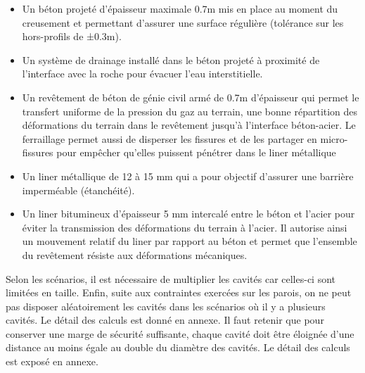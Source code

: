 \documentclass[11pt,french,a4paper]{article}
\begin{document}
\begin{itemize}
\item Un béton projeté d’épaisseur maximale 0.7m mis en place au moment du creusement et permettant d’assurer une surface régulière (tolérance sur les hors-profils de ±0.3m).
\item Un système de drainage installé dans le béton projeté à proximité de l'interface avec la roche pour évacuer l'eau interstitielle.
\item Un revêtement de béton de génie civil armé de 0.7m d'épaisseur qui permet le transfert  uniforme de la pression du gaz au terrain, une bonne répartition des déformations du terrain dans le revêtement jusqu’à l’interface béton-acier. Le ferraillage permet aussi de disperser les fissures et de les partager en micro-fissures pour empêcher qu’elles puissent pénétrer dans le liner métallique 
\item Un liner métallique de 12 à 15 mm qui a pour objectif d'assurer une barrière imperméable (étanchéité).
\item Un liner bitumineux d'épaisseur 5 mm intercalé entre le béton et l’acier pour éviter la transmission des déformations du terrain à l’acier. Il autorise ainsi un mouvement relatif du liner par rapport au béton et permet que l’ensemble du revêtement résiste aux déformations mécaniques.
\end{itemize}

Selon les scénarios, il est nécessaire de multiplier les cavités car celles-ci sont limitées en taille. Enfin, suite aux contraintes exercées sur les parois, on ne peut pas disposer aléatoirement les cavités dans les scénarios où il y a plusieurs cavités. Le détail des calculs est donné en annexe. Il faut retenir que pour conserver une marge de sécurité suffisante, chaque cavité doit être éloignée d’une distance au moins égale au double du diamètre des cavités. Le détail des calculs est exposé en annexe.
\end{document}
